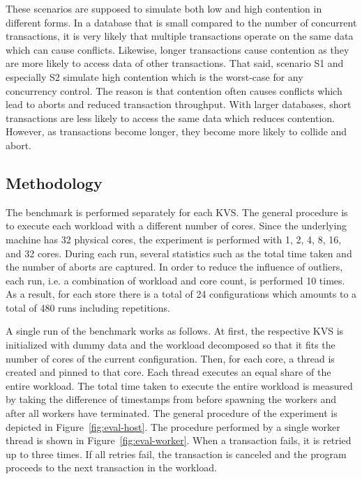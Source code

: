 
These scenarios are supposed to simulate both low and high contention in
different forms. In a database that is small compared to the number of
concurrent transactions, it is very likely that multiple transactions operate on
the same data which can cause conflicts. Likewise, longer transactions cause
contention as they are more likely to access data of other transactions. That
said, scenario S1 and especially S2 simulate high contention which is the
worst-case for any concurrency control. The reason is that contention often
causes conflicts which lead to aborts and reduced transaction throughput. With
larger databases, short transactions are less likely to access the same data
which reduces contention. However, as transactions become longer, they become
more likely to collide and abort.

\subsection{Methodology}

The benchmark is performed separately for each \ac{KVS}. The general procedure is to
execute each workload with a different number of cores. Since the underlying
machine has 32 physical cores, the experiment is performed with 1, 2, 4, 8, 16,
and 32 cores. During each run, several statistics such as the total time taken
and the number of aborts are captured. In order to reduce the influence of
outliers, each run, i.e. a combination of workload and core count, is performed
10 times. As a result, for each store there is a total of 24 configurations
which amounts to a total of 480 runs including repetitions.

A single run of the benchmark works as follows. At first, the respective \ac{KVS} is
initialized with dummy data and the workload decomposed so that it fits the
number of cores of the current configuration. Then, for each core, a thread is
created and pinned to that core. Each thread executes an equal share of the
entire workload. The total time taken to execute the entire workload is measured
by taking the difference of timestamps from before spawning the workers and
after all workers have terminated. The general procedure of the experiment is
depicted in Figure~\ref{fig:eval-host}. The procedure performed by a single
worker thread is shown in Figure~\ref{fig:eval-worker}. When a transaction
fails, it is retried up to three times. If all retries fail, the transaction is
canceled and the program proceeds to the next transaction in the workload.

